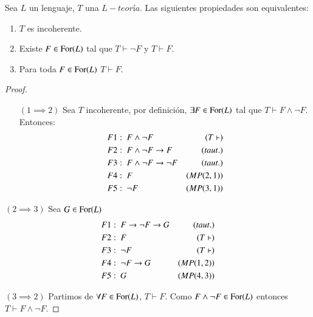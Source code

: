 \begin{pro}\label{pro:2.3}
    Sea $L$ un lenguaje, $T$ una $L-teoría$. Las siguientes propiedades son equivalentes:
    \begin{enumerate}
        \item $T$ es incoherente.
        \item Existe $F \in \mathrm{For}(L)$ tal que $T \vdash \neg F$ y $T \vdash F$.
        \item Para toda $F \in \mathrm{For}(L)$ $T \vdash F$.
    \end{enumerate}
\end{pro}
\begin{proof}$ $
    \begin{itemize}
        \item[$(1 \implies 2)$] Sea $T$ incoherente, por definición, $\exists F \in \mathrm{For}(L)$ tal que $T \vdash F \land \neg F$.
        Entonces:
        \begin{align*}
            &F1:\ F \land \neg F & (T \vdash)\\
            &F2:\ F \land \neg F \rightarrow F & (taut.)\\
            &F3:\ F \land \neg F \rightarrow \neg F & (taut.)\\
            &F4:\ F & (MP(2, 1))\\
            &F5:\ \neg F & (MP(3, 1))
        \end{align*}
    \end{itemize}
    \item[$(2 \implies 3)$] Sea $G \in \mathrm{For}(L)$
        \begin{align*}
            &F1:\ F \rightarrow \neg F \rightarrow G & (taut.)\\
            &F2:\ F                      & (T \vdash)\\
            &F3:\ \neg F                 & (T \vdash)\\
            &F4:\ \neg F \rightarrow G         & (MP(1, 2))\\
            &F5:\ G                      & (MP(4, 3))
        \end{align*}
    \item[$(3 \implies 2)$] Partimos de $\forall F \in \mathrm{For}(L)$, $T \vdash F$. Como $F \land \neg F \in \mathrm{For}(L)$ entonces $T \vdash F \land \neg F$.
\end{proof}
